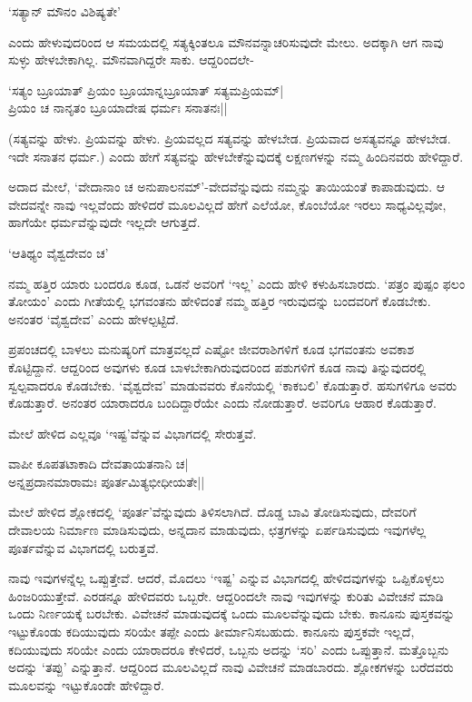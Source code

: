 \begin{shloka}
`ಸತ್ಯಾನ್ ಮೌನಂ ವಿಶಿಷ್ಯತೇ'
\end{shloka}

ಎಂದು ಹೇಳುವುದರಿಂದ ಆ ಸಮಯದಲ್ಲಿ ಸತ್ಯಕ್ಕಿಂತಲೂ ಮೌನವನ್ನಾಚರಿಸುವುದೇ ಮೇಲು. ಅದಕ್ಕಾಗಿ ಆಗ ನಾವು ಸುಳ್ಳು ಹೇಳಬೇಕಾಗಿಲ್ಲ. ಮೌನವಾಗಿದ್ದರೇ ಸಾಕು. ಆದ್ದರಿಂದಲೇ-

\begin{shloka}
`ಸತ್ಯಂ ಬ್ರೂಯಾತ್ ಪ್ರಿಯಂ ಬ್ರೂಯಾನ್ನಬ್ರೂಯಾತ್ ಸತ್ಯಮಪ್ರಿಯಮ್|\\
ಪ್ರಿಯಂ ಚ ನಾನೃತಂ ಬ್ರೂಯಾದೇಷ ಧರ್ಮಃ ಸನಾತನಃ||
\end{shloka}

(ಸತ್ಯವನ್ನು ಹೇಳು. ಪ್ರಿಯವನ್ನು ಹೇಳು. ಪ್ರಿಯವಲ್ಲದ ಸತ್ಯವನ್ನು ಹೇಳಬೇಡ. ಪ್ರಿಯವಾದ ಅಸತ್ಯವನ್ನೂ ಹೇಳಬೇಡ. ಇದೇ ಸನಾತನ ಧರ್ಮ.) ಎಂದು ಹೇಗೆ ಸತ್ಯವನ್ನು ಹೇಳಬೇಕೆನ್ನುವುದಕ್ಕೆ ಲಕ್ಷಣಗಳನ್ನು ನಮ್ಮ ಹಿಂದಿನವರು ಹೇಳಿದ್ದಾರೆ.

ಅದಾದ ಮೇಲೆ, `ವೇದಾನಾಂ ಚ ಅನುಪಾಲನಮ್'-ವೇದವೆನ್ನುವುದು ನಮ್ಮನ್ನು ತಾಯಿಯಂತೆ ಕಾಪಾಡುವುದು. ಆ ವೇದವನ್ನೇ ನಾವು ಇಲ್ಲವೆಂದು ಹೇಳಿದರೆ ಮೂಲವಿಲ್ಲದೆ ಹೇಗೆ ಎಲೆಯೋ, ಕೊಂಬೆಯೋ ಇರಲು ಸಾಧ್ಯವಿಲ್ಲವೋ, ಹಾಗೆಯೇ ಧರ್ಮವೆನ್ನುವುದೇ ಇಲ್ಲದೇ ಆಗುತ್ತದೆ.

\begin{shloka}
`ಆತಿಥ್ಯಂ ವೈಶ್ವದೇವಂ ಚ'
\end{shloka}

ನಮ್ಮ ಹತ್ತಿರ ಯಾರು ಬಂದರೂ ಕೂಡ, ಒಡನೆ ಅವರಿಗೆ `ಇಲ್ಲ' ಎಂದು ಹೇಳಿ ಕಳುಹಿಸಬಾರದು. `ಪತ್ರಂ ಪುಷ್ಪಂ ಫಲಂ ತೋಯಂ' ಎಂದು ಗೀತೆಯಲ್ಲಿ ಭಗವಂತನು ಹೇಳಿದಂತೆ ನಮ್ಮ ಹತ್ತಿರ ಇರುವುದನ್ನು ಬಂದವರಿಗೆ ಕೊಡಬೇಕು. ಅನಂತರ `ವೈಶ್ವದೇವ' ಎಂದು ಹೇಳಲ್ಪಟ್ಟಿದೆ.

ಪ್ರಪಂಚದಲ್ಲಿ ಬಾಳಲು ಮನುಷ್ಯರಿಗೆ ಮಾತ್ರವಲ್ಲದೆ ಎಷ್ಟೋ ಜೀವರಾಶಿಗಳಿಗೆ ಕೂಡ ಭಗವಂತನು ಅವಕಾಶ ಕೊಟ್ಟಿದ್ದಾನೆ. ಆದ್ದರಿಂದ ಅವುಗಳು ಕೂಡ ಬಾಳಬೇಕಾಗಿರುವುದರಿಂದ ಪಶುಗಳಿಗೆ ಕೂಡ ನಾವು ತಿನ್ನುವುದರಲ್ಲಿ ಸ್ವಲ್ಪವಾದರೂ ಕೊಡಬೇಕು. `ವೈಶ್ವದೇವ' ಮಾಡುವವರು ಕೊನೆಯಲ್ಲಿ `ಕಾಕಬಲಿ' ಕೊಡುತ್ತಾರೆ. ಹಸುಗಳಿಗೂ ಅವರು ಕೊಡುತ್ತಾರೆ. ಅನಂತರ ಯಾರಾದರೂ ಬಂದಿದ್ದಾರೆಯೇ ಎಂದು ನೋಡುತ್ತಾರೆ. ಅವರಿಗೂ ಆಹಾರ ಕೊಡುತ್ತಾರೆ.

ಮೇಲೆ ಹೇಳಿದ ಎಲ್ಲವೂ `ಇಷ್ಟ'ವೆನ್ನುವ ವಿಭಾಗದಲ್ಲಿ ಸೇರುತ್ತವೆ.

\begin{shloka}
ವಾಪೀ ಕೂಪತಟಾಕಾದಿ ದೇವತಾಯತನಾನಿ ಚ|\\
ಅನ್ನಪ್ರದಾನಮಾರಾಮಃ ಪೂರ್ತಮಿತ್ಯಭೀಧೀಯತೇ||
\end{shloka}

ಮೇಲೆ ಹೇಳಿದ ಶ್ಲೋಕದಲ್ಲಿ `ಪೂರ್ತ'ವೆನ್ನುವುದು ತಿಳಿಸಲಾಗಿದೆ. ದೊಡ್ಡ ಬಾವಿ ತೋಡಿಸುವುದು, ದೇವರಿಗೆ ದೇವಾಲಯ ನಿರ್ಮಾಣ ಮಾಡಿಸುವುದು, ಅನ್ನದಾನ ಮಾಡುವುದು, ಛತ್ರಗಳನ್ನು ಏರ್ಪಡಿಸುವುದು ಇವುಗಳೆಲ್ಲ ಪೂರ್ತವೆನ್ನುವ ವಿಭಾಗದಲ್ಲಿ ಬರುತ್ತವೆ.

ನಾವು ಇವುಗಳನ್ನೆಲ್ಲ ಒಪ್ಪುತ್ತೇವೆ. ಆದರೆ, ಮೊದಲು `ಇಷ್ಟ' ಎನ್ನುವ ವಿಭಾಗದಲ್ಲಿ ಹೇಳಿದವುಗಳನ್ನು ಒಪ್ಪಿಕೊಳ್ಳಲು ಹಿಂಜರಿಯುತ್ತೇವೆ. ಎರಡನ್ನೂ ಹೇಳಿದವರು ಒಬ್ಬರೇ. ಆದ್ದರಿಂದಲೇ ನಾವು ಇವುಗಳನ್ನು ಕುರಿತು ವಿವೇಚನೆ ಮಾಡಿ ಒಂದು ನಿರ್ಣಯಕ್ಕೆ ಬರಬೇಕು. ವಿವೇಚನೆ ಮಾಡುವುದಕ್ಕೆ ಒಂದು ಮೂಲವೆನ್ನುವುದು ಬೇಕು. ಕಾನೂನು ಪುಸ್ತಕವನ್ನು ಇಟ್ಟುಕೊಂಡು ಕದಿಯುವುದು ಸರಿಯೇ ತಪ್ಪೇ ಎಂದು ತೀರ್ಮಾನಿಸಬಹುದು. ಕಾನೂನು ಪುಸ್ತಕವೇ ಇಲ್ಲದೆ, ಕದಿಯುವುದು ಸರಿಯೇ ಎಂದು ಯಾರಾದರೂ ಕೇಳಿದರೆ, ಒಬ್ಬನು ಅದನ್ನು `ಸರಿ' ಎಂದು ಒಪ್ಪುತ್ತಾನೆ. ಮತ್ತೊಬ್ಬನು ಅದನ್ನು `ತಪ್ಪು' ಎನ್ನುತ್ತಾನೆ. ಆದ್ದರಿಂದ ಮೂಲವಿಲ್ಲದೆ ನಾವು ವಿವೇಚನೆ ಮಾಡಬಾರದು. ಶ್ಲೋಕಗಳನ್ನು ಬರೆದವರು ಮೂಲವನ್ನು ಇಟ್ಟುಕೊಂಡೇ ಹೇಳಿದ್ದಾರೆ.

